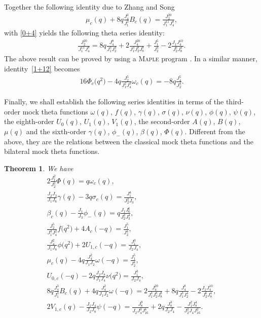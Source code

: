 \documentclass[pdftex]{sigma}
\numberwithin{equation}{section}
\newtheorem{Theorem}{Theorem}[section]
\begin{document}
\begin{Remark}
Together the following identity due to Zhang and Song \cite{ZS}
\begin{align*}%
\mu_c(q)+8q\frac{J_4^3}{J_1^3}B_c(q)=\frac{J_2^{20}}{J_1^{11}J_4^8},
\end{align*}
with \eqref{0+4} yields the following theta series identity:
\begin{align*}
\frac{J_2^{20}}{J_1^{11}J_4^8}=8q\frac{J_4^8}{J_1^3J_2^4}
+2\frac{J_4^{20}}{J_1^3J_2^8J_8^8}+\frac{J_1^5}{J_2^4}
-2\frac{J_1J_4^{10}}{J_2^6J_8^4}.
\end{align*}
The above result can be proved by using a \textsc{Maple} program \cite{FG}. In a similar manner, identity~\eqref{1+12} becomes
\begin{align*}
16\varPhi_c\bigl(q^2\bigr)-4q\frac{J_2^5}{J_1^2J_4^3}\omega_c(q)=-8q\frac{J_4^5}{J_2^4}.
\end{align*}
\end{Remark}

Finally, we shall establish the following series identities in terms of the third-order mock theta functions $\omega(q)$, $f(q)$, $\gamma(q)$, $\sigma(q)$, $\nu(q)$, $\phi(q)$, $\psi(q)$, the eighth-order $U_0(q)$, $U_1(q)$, $V_1(q)$, the second-order $A(q)$, $B(q)$, $\mu(q)$ and the sixth-order $\gamma(q)$, $\phi_-(q)$, $\beta(q)$, $\varPhi(q)$. Different from the above, they are the relations between the classical mock theta functions and the bilateral mock theta functions.
\begin{Theorem}\label{1+6}
We have
\begin{gather}
2\frac{J_1^2}{J_2^2}\varPhi(q)= q\omega_c(q),\label{1+13}\\
\frac{J_2J_3}{J_1J_6}\gamma(q)-3q\sigma_c(q)= \frac{J_1^4}{J_2^2J_3},\label{1+7}\\
\beta_c(q)-\frac{J_1}{J_3}\phi_-(q)= q\frac{J_1J_6^6}{J_2^2J_3^4},\label{1+8}\\
\frac{J_2^5}{J_1^3J_4^2}f\bigl(q^2\bigr)+4A_c(-q)= \frac{J_1^5}{J_2^4},\label{1+14}\\
\frac{J_4^2}{J_1J_8}\phi\bigl(q^2\bigr)+2U_{1,c}(-q)= \frac{J_1^3}{J_2J_4},\label{1+15}\\
\mu_c(q)-4q\frac{J_4^2}{J_1J_2}\omega(-q)= \frac{J_1^5}{J_2^4},\label{1+16}\\
U_{0,c}(-q)-2q\frac{J_2J_8}{J_1J_4}\nu\bigl(q^2\bigr)= \frac{J_1^3}{J_2J_4},\label{1+17}\\
8q\frac{J_4^3}{J_1^3}B_c(q)+4q\frac{J_4^2}{J_1J_2}\omega(-q)= 2\frac{J_4^{20}}{J_1^3J_2^8J_8^8}
+8q\frac{J_4^8}{J_1^3J_2^4}-2\frac{J_1J_4^{10}}{J_2^6J_8^4},\label{1+18}\\
2V_{1,c}(q)-\frac{J_1J_4}{J_2J_8}\psi(-q)= \frac{J_8^9}{J_2J_4^3J_{16}^4}+2q\frac{J_8^3}{J_2J_4}-\frac{J_1^2J_8^4}{J_2^2J_4J_{16}^2}.\label{1+19}
\end{gather}
\end{Theorem}
\end{document}
